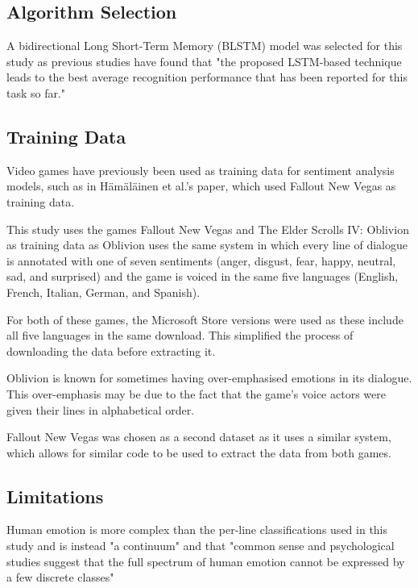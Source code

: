 \documentclass[journal]{IEEEtran}
\begin{document}
\subsection{Algorithm Selection}
A bidirectional Long Short-Term Memory (BLSTM) model was selected for this study as previous studies
have found that "the proposed LSTM-based technique leads to the best average recognition performance
that has been reported for this task so far." \cite{wollmer_lstm-modeling_2013}

\subsection{Training Data}
Video games have previously been used as training data for sentiment analysis models, such as in
Hämäläinen et al.'s paper, \cite{hamalainen_video_2022} which used Fallout New Vegas as training data.

This study uses the games Fallout New Vegas \cite{noauthor_buy_nodate} and
The Elder Scrolls IV: Oblivion \cite{noauthor_elder_nodate} as training data as
Oblivion uses the same system in which every line of dialogue is annotated with one of seven sentiments
(anger, disgust, fear, happy, neutral, sad, and surprised) and the game is voiced in the same five languages
(English, French, Italian, German, and Spanish).

For both of these games, the Microsoft Store versions were used as these include all five languages
in the same download. This simplified the process of downloading the data before extracting it.

Oblivion is known for sometimes having over-emphasised emotions in its dialogue.
This over-emphasis may be due to the fact that the game's voice actors were given their lines
in alphabetical order. \cite[1:00]{noclip_-_video_game_documentaries_music_2018}

Fallout New Vegas was chosen as a second dataset as it uses a similar system, which
allows for similar code to be used to extract the data from both games.

\subsection{Limitations}
Human emotion is more complex than the per-line classifications used in this study and is instead
"a continuum" and that "common sense and psychological studies suggest that the full spectrum of
human emotion cannot be expressed by a few discrete classes" \cite{wollmer_abandoning_2008}
\end{document}
